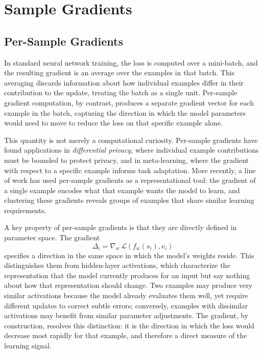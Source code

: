 \section{Sample Gradients}\label{sec:sample-gradients}

\subsection{Per-Sample Gradients}\label{sec:per-sample-gradients}

In standard neural network training, the loss is computed over a mini-batch, and the resulting gradient is an average over the examples in that batch. This averaging discards information about how individual examples differ in their contribution to the update, treating the batch as a single unit. Per-sample gradient computation, by contrast, produces a separate gradient vector for each example in the batch, capturing the direction in which the model parameters would need to move to reduce the loss on that specific example alone.

This quantity is not merely a computational curiosity. Per-sample gradients have found applications in \emph{differential privacy}, where individual example contributions must be bounded to protect privacy, and in meta-learning, where the gradient with respect to a specific example informs task adaptation. More recently, a line of work has used per-sample gradients as a representational tool: the gradient of a single example encodes what that example wants the model to learn, and clustering these gradients reveals groups of examples that share similar learning requirements.

A key property of per-sample gradients is that they are directly defined in parameter space. The gradient
\[
\Delta_i = \nabla_w \, \mathcal{L}(f_w(s_i), v_i)
\]
specifies a direction in the same space in which the model's weights reside. This distinguishes them from hidden-layer activations, which characterize the representation that the model currently produces for an input but say nothing about how that representation should change. Two examples may produce very similar activations because the model already evaluates them well, yet require different updates to correct subtle errors; conversely, examples with dissimilar activations may benefit from similar parameter adjustments. The gradient, by construction, resolves this distinction: it is the direction in which the loss would decrease most rapidly for that example, and therefore a direct measure of the learning signal.

